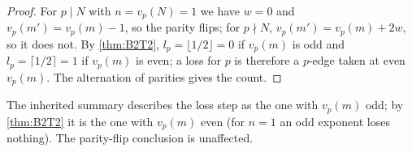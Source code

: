 \begin{proof}
For $p\mid N$ with $n=v_p(N)=1$ we have $w=0$ and $v_p(m')=v_p(m)-1$, so the parity flips; for $p\nmid N$, $v_p(m')=v_p(m)+2w$, so it does not. By \cref{thm:B2T2}, $l_p=\lfloor1/2\rfloor=0$ if $v_p(m)$ is odd and $l_p=\lceil1/2\rceil=1$ if $v_p(m)$ is even; a loss for $p$ is therefore a $p$-edge taken at even $v_p(m)$. The alternation of parities gives the count. \qedhere
\end{proof}
\begin{remark}
The inherited summary describes the loss step as the one with $v_p(m)$ odd; by \cref{thm:B2T2} it is the one with $v_p(m)$ even (for $n=1$ an odd exponent loses nothing). The parity-flip conclusion is unaffected.
\end{remark}

